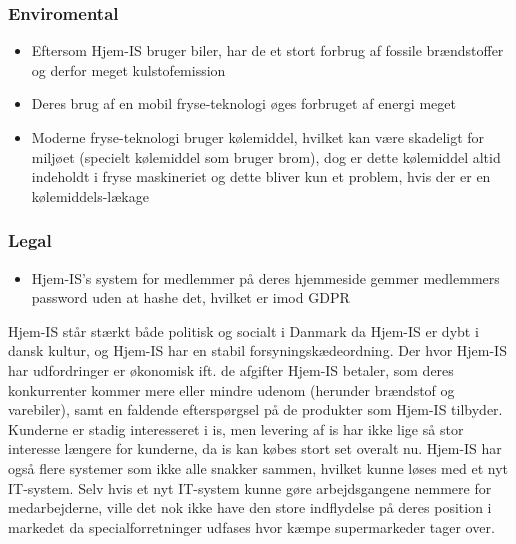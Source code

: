\subsubsection{Enviromental}
\begin{itemize}
    \item Eftersom Hjem-IS bruger biler, har de et stort forbrug af fossile brændstoffer og derfor meget kulstofemission
    \item Deres brug af en mobil fryse-teknologi øges forbruget af energi meget
    \item Moderne fryse-teknologi bruger kølemiddel, hvilket kan være skadeligt for miljøet (specielt kølemiddel som bruger brom), dog er dette kølemiddel altid indeholdt i fryse maskineriet og dette bliver kun et problem, hvis der er en kølemiddels-lækage \cite{Benhadid2012refrigerants}
\end{itemize}
\subsubsection{Legal}
\begin{itemize}
    \item Hjem-IS’s system for medlemmer på deres hjemmeside gemmer medlemmers password uden at hashe det, hvilket er imod GDPR 
\end{itemize}

Hjem-IS står stærkt både politisk og socialt i Danmark da Hjem-IS er dybt i dansk kultur, og Hjem-IS har en stabil forsyningskædeordning. Der hvor Hjem-IS har udfordringer er økonomisk ift. de afgifter Hjem-IS betaler, som deres konkurrenter kommer mere eller mindre udenom (herunder brændstof og varebiler), samt en faldende efterspørgsel på de produkter som Hjem-IS tilbyder. Kunderne er stadig interesseret i is, men levering af is har ikke lige så stor interesse længere for kunderne, da is kan købes stort set overalt nu. Hjem-IS har også flere systemer som ikke alle snakker sammen, hvilket kunne løses med et nyt IT-system. Selv hvis et nyt IT-system kunne gøre arbejdsgangene nemmere for medarbejderne, ville det nok ikke have den store indflydelse på deres position i markedet da specialforretninger udfases hvor kæmpe supermarkeder tager over.

